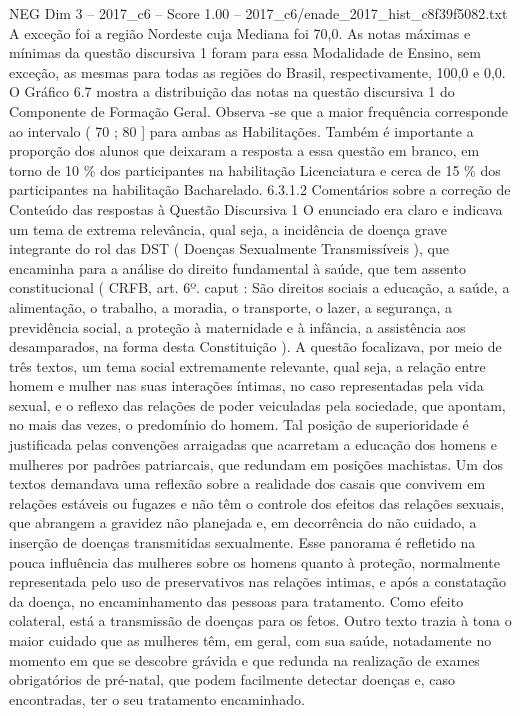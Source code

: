 \begin{textsample}{NEG Dim 3 – 2017\_c6 – Score 1.00 – 2017\_c6/enade\_2017\_hist\_c8f39f5082.txt}
A exceção foi a região Nordeste cuja Mediana foi 70,0.
As notas máximas e mínimas da questão discursiva 1 foram para essa Modalidade de Ensino, sem exceção, as mesmas para todas as regiões do Brasil, respectivamente, 100,0 e 0,0.
O Gráfico 6.7 mostra a distribuição das notas na questão discursiva 1 do Componente de Formação Geral.
Observa -se que a maior frequência corresponde ao intervalo ( 70 ; 80 ] para ambas as Habilitações.
Também é importante a proporção dos alunos que deixaram a resposta a essa questão em branco, em torno de 10 \% dos participantes na habilitação Licenciatura e cerca de 15 \% dos participantes na habilitação Bacharelado. 6.3.1.2 Comentários sobre a correção de Conteúdo das respostas à Questão Discursiva 1 O enunciado era claro e indicava um tema de extrema relevância, qual seja, a incidência de doença grave integrante do rol das DST ( Doenças Sexualmente Transmissíveis ), que encaminha para a análise do direito fundamental à saúde, que tem assento constitucional ( CRFB, art. 6º. caput : São direitos sociais a educação, a saúde, a alimentação, o trabalho, a moradia, o transporte, o lazer, a segurança, a previdência social, a proteção à maternidade e à infância, a assistência aos desamparados, na forma desta Constituição ).
A questão focalizava, por meio de três textos, um tema social extremamente relevante, qual seja, a relação entre homem e mulher nas suas interações íntimas, no caso representadas pela vida sexual, e o reflexo das relações de poder veiculadas pela sociedade, que apontam, no mais das vezes, o predomínio do homem.
Tal posição de superioridade é justificada pelas convenções arraigadas que acarretam a educação dos homens e mulheres por padrões patriarcais, que redundam em posições machistas.
Um dos textos demandava uma reflexão sobre a realidade dos casais que convivem em relações estáveis ou fugazes e não têm o controle dos efeitos das relações sexuais, que abrangem a gravidez não planejada e, em decorrência do não cuidado, a inserção de doenças transmitidas sexualmente.
Esse panorama é refletido na pouca influência das mulheres sobre os homens quanto à proteção, normalmente representada pelo uso de preservativos nas relações intimas, e após a constatação da doença, no encaminhamento das pessoas para tratamento.
Como efeito colateral, está a transmissão de doenças para os fetos.
Outro texto trazia à tona o maior cuidado que as mulheres têm, em geral, com sua saúde, notadamente no momento em que se descobre grávida e que redunda na realização de exames obrigatórios de pré-natal, que podem facilmente detectar doenças e, caso encontradas, ter o seu tratamento encaminhado.

\end{textsample}
